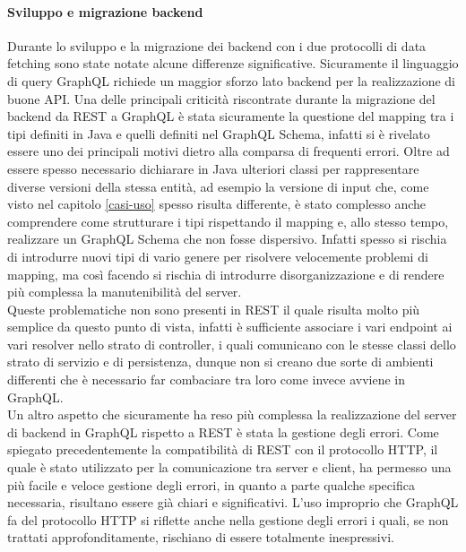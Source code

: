 \paragraph{Sviluppo e migrazione backend}
Durante lo sviluppo e la migrazione dei backend con i due protocolli di data fetching sono state notate alcune differenze significative. Sicuramente il linguaggio di query GraphQL richiede un maggior sforzo lato backend per la realizzazione di buone API. Una delle principali criticità riscontrate durante la migrazione del backend da REST a GraphQL è stata sicuramente la questione del mapping tra i tipi definiti in Java e quelli definiti nel GraphQL Schema, infatti si è rivelato essere uno dei principali motivi dietro alla comparsa di frequenti errori. Oltre ad essere spesso necessario dichiarare in Java ulteriori classi per rappresentare diverse versioni della stessa entità, ad esempio la versione di input che, come visto nel capitolo \ref{casi-uso} spesso risulta differente, è stato complesso anche comprendere come strutturare i tipi rispettando il mapping e, allo stesso tempo, realizzare un GraphQL Schema che non fosse dispersivo. Infatti spesso si rischia di introdurre nuovi tipi di vario genere per risolvere velocemente problemi di mapping, ma così facendo si rischia di introdurre disorganizzazione e di rendere più complessa la manutenibilità del server. \\
Queste problematiche non sono presenti in REST il quale risulta molto più semplice da questo punto di vista, infatti è sufficiente associare i vari endpoint ai vari resolver nello strato di controller, i quali comunicano con le stesse classi dello strato di servizio e di persistenza, dunque non si creano due sorte di ambienti differenti che è necessario far combaciare tra loro come invece avviene in GraphQL.\\
Un altro aspetto che sicuramente ha reso più complessa la realizzazione del server di backend in GraphQL rispetto a REST è stata la gestione degli errori. Come spiegato precedentemente la compatibilità di REST con il protocollo HTTP, il quale è stato utilizzato per la comunicazione tra server e client, ha permesso una più facile e veloce gestione degli errori, in quanto a parte qualche specifica necessaria, risultano essere già chiari e significativi. L'uso improprio che GraphQL fa del protocollo HTTP si riflette anche nella gestione degli errori i quali, se non trattati approfonditamente, rischiano di essere totalmente inespressivi.
